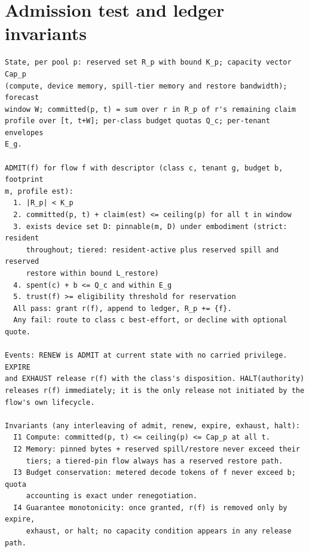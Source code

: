 \onecolumn

\section{Admission test and ledger invariants}

{\small
\begin{verbatim}
State, per pool p: reserved set R_p with bound K_p; capacity vector Cap_p
(compute, device memory, spill-tier memory and restore bandwidth); forecast
window W; committed(p, t) = sum over r in R_p of r's remaining claim
profile over [t, t+W]; per-class budget quotas Q_c; per-tenant envelopes
E_g.

ADMIT(f) for flow f with descriptor (class c, tenant g, budget b, footprint
m, profile est):
  1. |R_p| < K_p
  2. committed(p, t) + claim(est) <= ceiling(p) for all t in window
  3. exists device set D: pinnable(m, D) under embodiment (strict: resident
     throughout; tiered: resident-active plus reserved spill and reserved
     restore within bound L_restore)
  4. spent(c) + b <= Q_c and within E_g
  5. trust(f) >= eligibility threshold for reservation
  All pass: grant r(f), append to ledger, R_p += {f}.
  Any fail: route to class c best-effort, or decline with optional quote.

Events: RENEW is ADMIT at current state with no carried privilege. EXPIRE
and EXHAUST release r(f) with the class's disposition. HALT(authority)
releases r(f) immediately; it is the only release not initiated by the
flow's own lifecycle.

Invariants (any interleaving of admit, renew, expire, exhaust, halt):
  I1 Compute: committed(p, t) <= ceiling(p) <= Cap_p at all t.
  I2 Memory: pinned bytes + reserved spill/restore never exceed their
     tiers; a tiered-pin flow always has a reserved restore path.
  I3 Budget conservation: metered decode tokens of f never exceed b; quota
     accounting is exact under renegotiation.
  I4 Guarantee monotonicity: once granted, r(f) is removed only by expire,
     exhaust, or halt; no capacity condition appears in any release path.
\end{verbatim}
}
